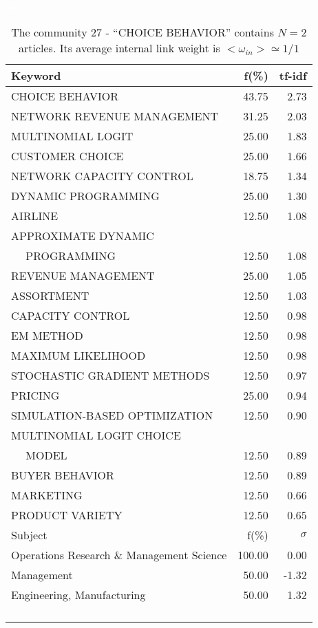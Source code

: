 \documentclass[a4paper,11pt]{report}
\begin{document}
\begin{landscape}
\clearpage

\begin{table}[!ht]
\caption{The community 27 - ``CHOICE BEHAVIOR'' contains $N = 2$ articles. Its average internal link weight is $<\omega_{in}> \simeq 1/1$ }
\textcolor{white}{aa}\\
{\scriptsize\begin{tabular}{|l r  r|}
\hline
Keyword & f(\%) & tf-idf \\
\hline
CHOICE BEHAVIOR & 43.75 & 2.73\\
NETWORK REVENUE MANAGEMENT & 31.25 & 2.03\\
MULTINOMIAL LOGIT & 25.00 & 1.83\\
CUSTOMER CHOICE & 25.00 & 1.66\\
NETWORK CAPACITY CONTROL & 18.75 & 1.34\\
DYNAMIC PROGRAMMING & 25.00 & 1.30\\
AIRLINE & 12.50 & 1.08\\
APPROXIMATE DYNAMIC &  &\\
$\quad$ PROGRAMMING & 12.50 & 1.08\\
REVENUE MANAGEMENT & 25.00 & 1.05\\
ASSORTMENT & 12.50 & 1.03\\
CAPACITY CONTROL & 12.50 & 0.98\\
EM METHOD & 12.50 & 0.98\\
MAXIMUM LIKELIHOOD & 12.50 & 0.98\\
STOCHASTIC GRADIENT METHODS & 12.50 & 0.97\\
PRICING & 25.00 & 0.94\\
SIMULATION-BASED OPTIMIZATION & 12.50 & 0.90\\
MULTINOMIAL LOGIT CHOICE &  &\\
$\quad$ MODEL & 12.50 & 0.89\\
BUYER BEHAVIOR & 12.50 & 0.89\\
MARKETING & 12.50 & 0.66\\
PRODUCT VARIETY & 12.50 & 0.65\\
\hline
\hline
Subject & f(\%) & $\sigma$\\
\hline
Operations Research \& Management Science & 100.00 & 0.00\\
Management & 50.00 & -1.32\\
Engineering, Manufacturing & 50.00 & 1.32\\
 &  & \\
 &  & \\
 &  & \\
 &  & \\

\end{tabular}}
\end{table}
\end{landscape}
\end{document}

